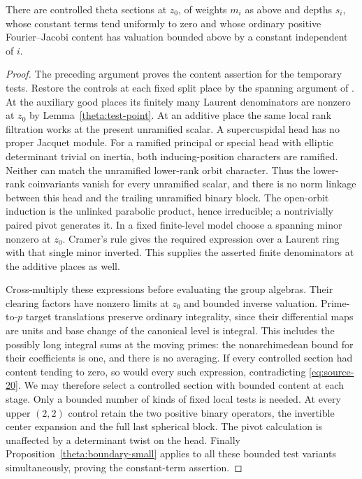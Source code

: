 \begin{lemma}
\label{extraction:content}
There are controlled theta sections at $z_0$, of weights $m_i$
as above and depths $s_i$, whose constant terms tend uniformly to
zero and whose ordinary positive Fourier--Jacobi content has
valuation bounded above by a constant independent of $i$.
\end{lemma}

\begin{proof}
The preceding argument proves the content assertion for the
temporary tests.  Restore the controls at each fixed split place
by the spanning argument of \cite[Lemma~6.4]{C}.  At the auxiliary good
places its finitely many Laurent denominators are nonzero at
$z_0$ by Lemma~\ref{theta:test-point}.  At an additive place the
same local rank filtration works at the present unramified scalar.
A supercuspidal head has no proper Jacquet module.  For a ramified
principal or special head with elliptic determinant trivial on
inertia, both inducing-position characters are ramified.  Neither
can match the unramified lower-rank orbit character.  Thus the
lower-rank coinvariants vanish for every unramified scalar, and
there is no norm linkage between this head and the trailing
unramified binary block.  The open-orbit induction is the
unlinked parabolic product, hence irreducible; a nontrivially
paired pivot generates it.  In a fixed finite-level model choose
a spanning minor nonzero at $z_0$.  Cramer's rule gives the
required expression over a Laurent ring with that single minor
inverted.  This supplies the asserted finite denominators at the
additive places as well.

Cross-multiply these expressions before evaluating the group
algebras.  Their clearing factors have nonzero limits at $z_0$
and bounded inverse valuation.  Prime-to-$p$ target translations
preserve ordinary integrality, since their differential maps are
units and base change of the canonical level is integral.  This
includes the possibly long integral sums at the moving primes:
the nonarchimedean bound for their coefficients is one, and there
is no averaging.  If every controlled section had content tending
to zero, so would every such expression, contradicting
\eqref{eq:source-20}.  We may therefore select a controlled
section with bounded content at each stage.  Only a bounded
number of kinds of fixed local tests is needed.  At every upper
$(2,2)$ control retain the two positive binary operators, the
invertible center expansion and the full last spherical block.
The pivot calculation is unaffected by a determinant twist on
the head.  Finally Proposition~\ref{theta:boundary-small} applies
to all these bounded test variants simultaneously, proving the
constant-term assertion.
\end{proof}

